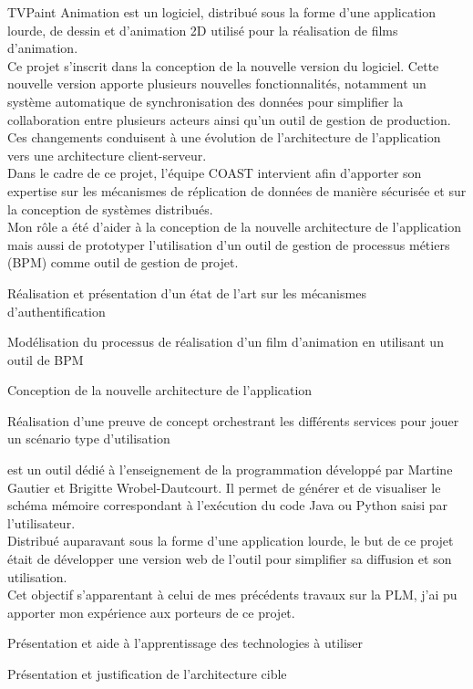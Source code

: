 \documentclass[]{deedy-resume-openfont}
\begin{document}
\begin{minipage}{\dimexpr\textwidth-0.5cm}
TVPaint Animation est un logiciel, distribué sous la forme d'une application lourde, de dessin et d'animation 2D utilisé pour la réalisation de films d'animation.
\\
Ce projet s'inscrit dans la conception de la nouvelle version du logiciel.
Cette nouvelle version apporte plusieurs nouvelles fonctionnalités,
notamment un système automatique de synchronisation des données pour simplifier la collaboration entre plusieurs acteurs
ainsi qu'un outil de gestion de production.
Ces changements conduisent à une évolution de l'architecture de l'application vers une architecture client-serveur.
\\
Dans le cadre de ce projet, l'équipe COAST intervient afin d'apporter son expertise sur les mécanismes de réplication de données de manière sécurisée
et sur la conception de systèmes distribués.
\\
Mon rôle a été d'aider à la conception de la nouvelle architecture de l'application
mais aussi de prototyper l'utilisation d'un outil de gestion de processus métiers (BPM) comme outil de gestion de projet.
\begin{tightemize}
\item Réalisation et présentation d'un état de l'art sur les mécanismes d'authentification
\item Modélisation du processus de réalisation d'un film d'animation en utilisant un outil de BPM
\item Conception de la nouvelle architecture de l'application
\item Réalisation d'une preuve de concept orchestrant les différents services pour jouer un scénario type d'utilisation
\end{tightemize}
\sectionsep\xdef\tpd{\the\prevdepth}
\end{minipage}

\hfill\begin{minipage}{\dimexpr\textwidth-0.5cm}
\href{http://arteoz.loria.fr/}{} est un outil dédié à l'enseignement de la programmation développé par Martine Gautier et Brigitte Wrobel-Dautcourt.
Il permet de générer et de visualiser le schéma mémoire correspondant à l'exécution du code Java ou Python saisi par l'utilisateur.
\\
Distribué auparavant sous la forme d'une application lourde, le but de ce projet était de développer une version web de l'outil pour simplifier sa diffusion et son utilisation.
\\
Cet objectif s'apparentant à celui de mes précédents travaux sur la PLM, j'ai pu apporter mon expérience aux porteurs de ce projet.
\begin{tightemize}
\item Présentation et aide à l'apprentissage des technologies à utiliser
\item Présentation et justification de l'architecture cible
\end{tightemize}

\sectionsep\xdef\tpd{\the\prevdepth}
\end{minipage}
\end{document}
